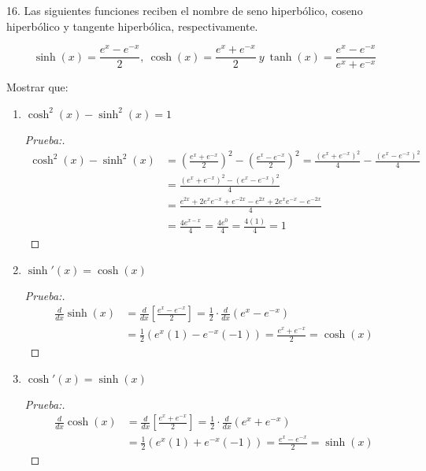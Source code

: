 \documentclass[12pt]{article}
\begin{document}
16. Las siguientes funciones reciben el nombre de seno hiperb\'olico, coseno hiperb\'olico y tangente hiperb\'olica, respectivamente.

\begin{equation*}
    \sinh(x)=\frac{e^x-e^{-x}}{2}, \ \cosh(x)=\frac{e^x+e^{-x}}{2} \ y \ \tanh(x)=\frac{e^x-e^{-x}}{e^x+e^{-x}}
\end{equation*}

Mostrar que:

\begin{enumerate}[\hspace{9px} a)]
    \item \(\cosh^2(x)-\sinh^2(x)=1\)
    
        \begin{proof}[Prueba:]
            \begin{align*}
                \cosh^2(x)-\sinh^2(x) &= \left(\frac{e^x+e^{-x}}{2}\right)^2-\left(\frac{e^x-e^{-x}}{2}\right)^2 = \frac{(e^x+e^{-x})^2}{4} - \frac{(e^x-e^{-x})^2}{4}\\
                &= \frac{(e^x+e^{-x})^2-(e^x-e^{-x})^2}{4} \\
                &= \frac{e^{2x}+2e^xe^{-x}+e^{-2x}-e^{2x}+2e^xe^{-x}-e^{-2x}}{4}\\
                &= \frac{4e^{x-x}}{4} = \frac{4e^0}{4} = \frac{4(1)}{4} = 1
            \end{align*}
        \end{proof}

    \item \(\sinh'(x)=\cosh(x)\)
    
        \begin{proof}[Prueba:]
            \begin{align*}
                \frac{d}{dx}\sinh(x) &= \frac{d}{dx}\left[\frac{e^x-e^{-x}}{2}\right] = \frac{1}{2}\cdot\frac{d}{dx}(e^x-e^{-x})\\
                &= \frac{1}{2}(e^x(1)-e^{-x}(-1)) = \frac{e^x+e^{-x}}{2} = \cosh(x)
            \end{align*}
        \end{proof}

    \item \(\cosh'(x)=\sinh(x)\) 
    
        \begin{proof}[Prueba:]
            \begin{align*}
                \frac{d}{dx}\cosh(x) &= \frac{d}{dx}\left[\frac{e^x+e^{-x}}{2}\right] = \frac{1}{2}\cdot\frac{d}{dx}(e^x+e^{-x})\\
                &= \frac{1}{2}(e^x(1)+e^{-x}(-1)) = \frac{e^x-e^{-x}}{2} = \sinh(x)
            \end{align*}
        \end{proof}


\end{enumerate}
\end{document}
